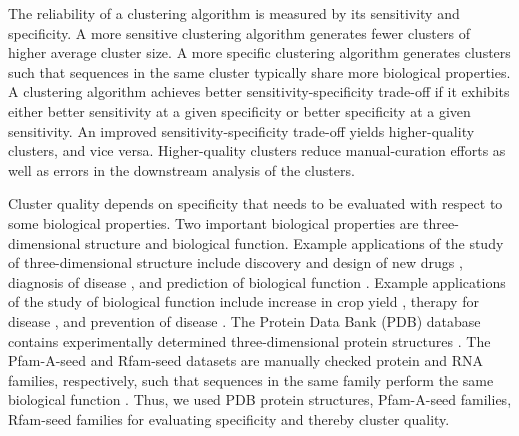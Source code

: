 \documentclass[11pt,letterpaper]{llncs2e/llncs}
\begin{document}

The reliability of a clustering algorithm is measured by its sensitivity and specificity.
A more sensitive clustering algorithm generates fewer clusters of higher average cluster size.
A more specific clustering algorithm generates clusters such that sequences in the same cluster typically share more biological properties.
A clustering algorithm achieves better sensitivity-specificity trade-off if it exhibits either better sensitivity at a given specificity or better specificity at a given sensitivity.
An improved sensitivity-specificity trade-off yields higher-quality clusters, and vice versa.
Higher-quality clusters reduce manual-curation efforts as well as errors in the downstream analysis of the clusters.

Cluster quality depends on specificity that needs to be evaluated with respect to some biological properties.
Two %
important biological properties are three-dimensional structure and biological function.
Example applications of the study of three-dimensional structure include
discovery and design of new drugs  \citep{kryger1999structure}, 
diagnosis of disease \citep{gniadecka2004melanoma}, and
prediction of biological function \citep{berg2002protein}.
Example applications of the study of biological function include
increase in crop yield \citep{xu2011functions},
therapy for disease \citep{cowen2009harnessing,egen2002ctla}, and
prevention of disease \citep{kris2004bioactive}.
The Protein Data Bank (PDB) database contains experimentally determined three-dimensional protein structures \cite{berman2006protein}.
The Pfam-A-seed and Rfam-seed datasets are manually checked protein and RNA families, respectively, such that sequences in the same family perform the same biological function \citep{finn2016pfam,nawrocki2014rfam}.
Thus, we used PDB protein structures, Pfam-A-seed families,  Rfam-seed families for evaluating specificity and thereby cluster quality.
\end{document}
